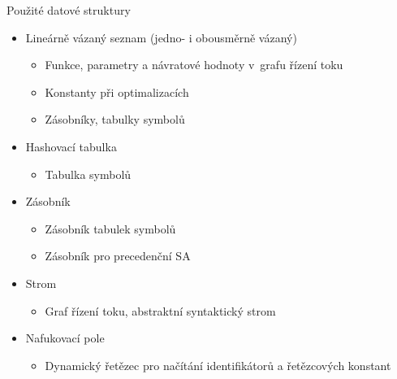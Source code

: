 \documentclass[10pt,xcolor=pdflatex,hyperref={unicode,hidelinks}]{beamer}
\begin{document}
\begin{frame}{Použité datové struktury}
    \begin{itemize}
        \item Lineárně vázaný seznam (jedno- i obousměrně vázaný)
            \begin{itemize}
                \item Funkce, parametry a návratové hodnoty v~grafu řízení toku
                \item Konstanty při optimalizacích
                \item Zásobníky, tabulky symbolů
            \end{itemize}
        \item Hashovací tabulka
            \begin{itemize}
                \item Tabulka symbolů
            \end{itemize}
        \item Zásobník
            \begin{itemize}
                \item Zásobník tabulek symbolů
                \item Zásobník pro precedenční SA
            \end{itemize}
        \item Strom
            \begin{itemize}
                \item Graf řízení toku, abstraktní syntaktický strom
            \end{itemize}
        \item Nafukovací pole
        \begin{itemize}
                \item Dynamický řetězec pro načítání identifikátorů a řetězcových konstant
            \end{itemize}
    \end{itemize}
\end{frame}


\end{document}
